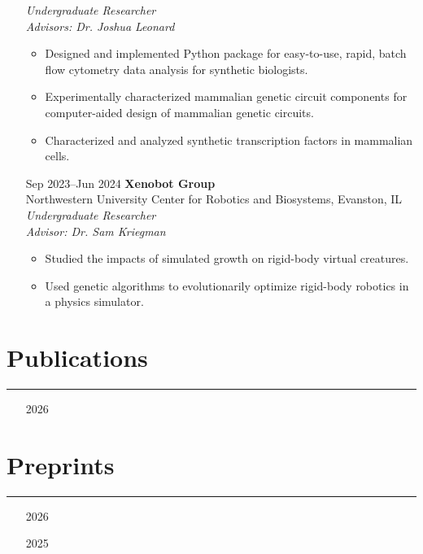 \documentclass{article}
\begin{document}
\begin{itemize}[leftmargin=1.5in]
    \textit{Undergraduate Researcher}\\
    \textit{Advisors: Dr. Joshua Leonard}
    \begin{itemize}
        \item Designed and implemented Python package for easy-to-use, rapid, batch flow cytometry data analysis for synthetic biologists.
        \item Experimentally characterized mammalian genetic circuit components for computer-aided design of mammalian genetic circuits.
        \item Characterized and analyzed synthetic transcription factors in mammalian cells.
    \end{itemize}
    \item[Sep 2023–Jun 2024] \textbf{Xenobot Group}\\
     Northwestern University Center for Robotics and Biosystems, Evanston, IL\\
    \textit{Undergraduate Researcher}\\
    \textit{Advisor: Dr. Sam Kriegman}
    \begin{itemize}
        \item Studied the impacts of simulated growth on rigid-body virtual creatures.
        \item Used genetic algorithms to evolutionarily optimize rigid-body robotics in a physics simulator.
    \end{itemize}
\end{itemize}

\section*{Publications}
\hrule
\vspace{10pt}

\begin{itemize}[leftmargin=1.5in]
    \item[2026] 
\end{itemize}

\section*{Preprints}
\hrule
\vspace{10pt}

\begin{itemize}[leftmargin=1.5in]
    \item[2026] 
    \item[2025] 
\end{itemize}
\end{document}

